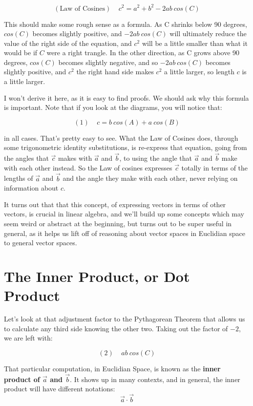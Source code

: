 \documentclass[
]{book}
\begin{document}
\[(\text{Law of Cosines}) \ \ \ \ \ c^2 = a^2 + b^2 - 2 a b \ cos(C)\]

This should make some rough sense as a formula. As C shrinks below 90 degrees, \(cos(C)\) becomes slightly positive, and \(-2 a b \ cos(C)\) will ultimately reduce the value of the right side of the equation, and \(c^2\) will be a little smaller than what it would be if \(C\) were a right trangle. In the other direction, as C grows above 90 degrees, \(cos(C)\) becomes slightly negative, and so \(-2 a b \ cos(C)\) becomes slightly positive, and \(c^2\) the right hand side makes \(c^2\) a little larger, so length \(c\) is a little larger.

I won't derive it here, as it is easy to find proofs. We should ask why this formula is important. Note that if you look at the diagrams, you will notice that:

\[(1) \ \ \ \ \ c = b \ cos(A) + a \ cos(B)\]

in all cases. That's pretty easy to see. What the Law of Cosines does, through some trigonometric identity substitutions, is re-express that equation, going from the angles that \(\vec{c}\) makes with \(\vec{a}\) and \(\vec{b}\), to using the angle that \(\vec{a}\) and \(\vec{b}\) make with each other instead. So the Law of cosines expresses \(\vec{c}\) totally in terms of the lengths of \(\vec{a}\) and \(\vec{b}\) and the angle they make with each other, never relying on information about \(c\).

It turns out that that this concept, of expressing vectors in terms of other vectors, is crucial in linear algebra, and we'll build up some concepts which may seem weird or abstract at the beginning, but turns out to be super useful in general, as it helps us lift off of reasoning about vector spaces in Euclidian space to general vector spaces.

\hypertarget{the-inner-product-or-dot-product}{%
\section{The Inner Product, or Dot Product}\label{the-inner-product-or-dot-product}}

Let's look at that adjustment factor to the Pythagorean Theorem that allows us to calculate any third side knowing the other two. Taking out the factor of \(-2\), we are left with:

\[(2) \ \ \ \ \ a b \ cos(C)\]

That particular computation, in Euclidian Space, is known as the \textbf{inner product of \(\vec{a}\) and \(\vec{b}\)}. It shows up in many contexts, and in general, the inner product will have different notations:
\[\vec{a} \cdot \vec{b}\]
\end{document}
